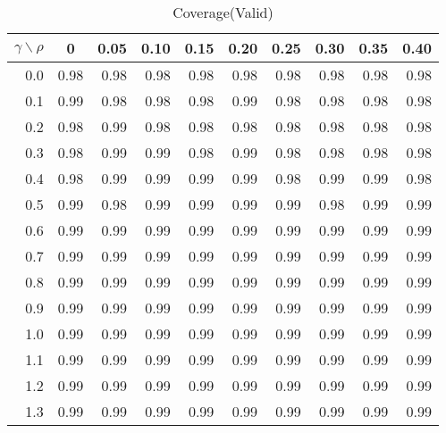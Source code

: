 \documentclass[12pt]{article}
\begin{document}
%
\begin{table}[!tbp]
\caption{Coverage(Valid)}
 \begin{center}
 \begin{tabular}{r|rrrrrrrrr}\hline\hline
\multicolumn{1}{c|}{$\gamma\backslash\rho$}&\multicolumn{1}{c}{0}&\multicolumn{1}{c}{0.05}&\multicolumn{1}{c}{0.10}&\multicolumn{1}{c}{0.15}&\multicolumn{1}{c}{0.20}&\multicolumn{1}{c}{0.25}&\multicolumn{1}{c}{0.30}&\multicolumn{1}{c}{0.35}&\multicolumn{1}{c}{0.40}\tabularnewline
\hline
0.0&0.98&0.98&0.98&0.98&0.98&0.98&0.98&0.98&0.98\tabularnewline
0.1&0.99&0.98&0.98&0.98&0.99&0.98&0.98&0.98&0.98\tabularnewline
0.2&0.98&0.99&0.98&0.98&0.98&0.98&0.98&0.98&0.98\tabularnewline
0.3&0.98&0.99&0.99&0.98&0.99&0.98&0.98&0.98&0.98\tabularnewline
0.4&0.98&0.99&0.99&0.99&0.99&0.98&0.99&0.99&0.98\tabularnewline
0.5&0.99&0.98&0.99&0.99&0.99&0.99&0.98&0.99&0.99\tabularnewline
0.6&0.99&0.99&0.99&0.99&0.99&0.99&0.99&0.99&0.99\tabularnewline
0.7&0.99&0.99&0.99&0.99&0.99&0.99&0.99&0.99&0.99\tabularnewline
0.8&0.99&0.99&0.99&0.99&0.99&0.99&0.99&0.99&0.99\tabularnewline
0.9&0.99&0.99&0.99&0.99&0.99&0.99&0.99&0.99&0.99\tabularnewline
1.0&0.99&0.99&0.99&0.99&0.99&0.99&0.99&0.99&0.99\tabularnewline
1.1&0.99&0.99&0.99&0.99&0.99&0.99&0.99&0.99&0.99\tabularnewline
1.2&0.99&0.99&0.99&0.99&0.99&0.99&0.99&0.99&0.99\tabularnewline
1.3&0.99&0.99&0.99&0.99&0.99&0.99&0.99&0.99&0.99\tabularnewline
\hline
\end{tabular}

\end{center}

\end{table}
\end{document}
